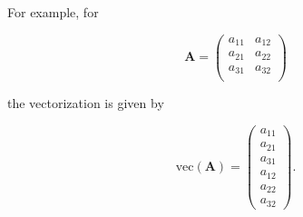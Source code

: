 \noindent For example, for

\begin{equation}
	\mathbf{A}
	=
	\left(
	\begin{array}{cc}
		a_{11} & a_{12} \\
		a_{21} & a_{22} \\
		a_{31} & a_{32} \\
	\end{array}
	\right)
\end{equation}

\noindent the vectorization is given by

\begin{equation}
	\mathrm{vec}
	\left(
	\mathbf{A}
	\right)
	=
	\left(
	\begin{array}{c}
		a_{11} \\
		a_{21} \\ 
		a_{31} \\ 
		a_{12} \\
		a_{22} \\
		a_{32} 
	\end{array}
	\right).
\end{equation}
